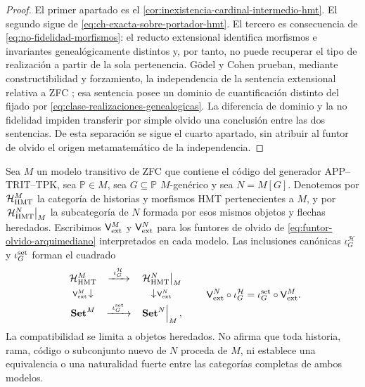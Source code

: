 \begin{proof}
El primer apartado es el
\cref{cor:inexistencia-cardinal-intermedio-hmt}. El segundo sigue de
\eqref{eq:ch-exacta-sobre-portador-hmt}. El tercero es consecuencia de
\eqref{eq:no-fidelidad-morfismos}: el reducto extensional identifica
morfismos e invariantes geneal\'ogicamente distintos y, por tanto, no puede
recuperar el tipo de realizaci\'on a partir de la sola pertenencia. G\"odel y
Cohen prueban, mediante constructibilidad y forzamiento, la independencia de
la sentencia extensional relativa a ZFC \cite{Godel1940,Cohen1963}; esa
sentencia posee un dominio de cuantificaci\'on distinto del fijado por
\eqref{eq:clase-realizaciones-genealogicas}. La diferencia de dominio y la
no fidelidad impiden transferir por simple olvido una conclusi\'on entre las
dos sentencias. De esta separaci\'on se sigue el cuarto apartado, sin atribuir
al funtor de olvido el origen metamatem\'atico de la independencia.
\end{proof}

\begin{proposition}
\label{prop:cuadrado-forcing-heredado-hmt-autonomo}
Sea \(M\) un modelo transitivo de ZFC que contiene el código del generador
APP--TRIT--TPK, sea \(\mathbb P\in M\), sea \(G\subseteq\mathbb P\)
\(M\)-genérico y sea \(N=M[G]\). Denotemos por
\(\mathcal H_{\rm HMT}^{M}\) la categoría de historias y morfismos HMT
pertenecientes a \(M\), y por
\(\left.\mathcal H_{\rm HMT}^{N}\right|_{M}\) la subcategoría de \(N\)
formada por esos mismos objetos y flechas heredados. Escribimos
\(\mathsf V_{\rm ext}^{M}\) y \(\mathsf V_{\rm ext}^{N}\) para los
funtores de olvido de \eqref{eq:funtor-olvido-arquimediano} interpretados
en cada modelo. Las inclusiones
canónicas \(\iota_G^{\mathcal H}\) y \(\iota_G^{\rm set}\) forman el
cuadrado
\begin{equation}
\begin{array}{ccc}
 \mathcal H_{\rm HMT}^{M}
 &\xrightarrow{\ \iota_G^{\mathcal H}\ }&
 \left.\mathcal H_{\rm HMT}^{N}\right|_{M}\\[3pt]
 {\scriptstyle\mathsf V_{\rm ext}^{M}}\!\downarrow
 &&\downarrow\!{\scriptstyle\mathsf V_{\rm ext}^{N}}\\[3pt]
 \mathbf{Set}^{M}
 &\xrightarrow{\ \iota_G^{\rm set}\ }&
 \left.\mathbf{Set}^{N}\right|_{M},
\end{array}
\qquad
 \mathsf V_{\rm ext}^{N}\circ\iota_G^{\mathcal H}
 =\iota_G^{\rm set}\circ\mathsf V_{\rm ext}^{M}.
\label{eq:cuadrado-forcing-heredado-hmt-autonomo}
\end{equation}
La compatibilidad se limita a objetos heredados. No afirma que toda
historia, rama, código o subconjunto nuevo de \(N\) proceda de \(M\), ni
establece una equivalencia o una naturalidad fuerte entre las categorías
completas de ambos modelos.
\end{proposition}

